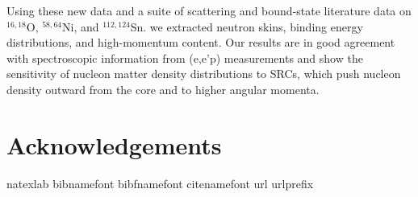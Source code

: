 \documentclass[twocolumn,secnumarabic,amssymb, nobibnotes, aps, prl,
superscriptaddress, nobalancelastpage]{revtex4}
\newcommand{\oSixEight}{\ensuremath{^{16,18}}O}
\newcommand{\niEightFour}{\ensuremath{^{58,64}}N\lowercase{i}}
\newcommand{\snTwelveFour}{\ensuremath{^{112,124}}S\lowercase{n}}
\begin{document}
Using these new data and a suite of scattering and bound-state literature data
on \oSixEight, \niEightFour, and \snTwelveFour.
we extracted neutron skins, binding energy distributions, and high-momentum
content. Our results are in good agreement with spectroscopic information
from (e,e'p) measurements and show the sensitivity of nucleon matter density
distributions to SRCs, which push nucleon density outward from the core and
to higher angular momenta.

\section{Acknowledgements}


\begin{thebibliography}{32} \expandafter\ifx\csname
        natexlab\endcsname\relax\def\natexlab#1{#1}\fi \expandafter\ifx\csname
        bibnamefont\endcsname\relax \def\bibnamefont#1{#1}\fi
        \expandafter\ifx\csname bibfnamefont\endcsname\relax
        \def\bibfnamefont#1{#1}\fi \expandafter\ifx\csname
        citenamefont\endcsname\relax \def\citenamefont#1{#1}\fi
        \expandafter\ifx\csname url\endcsname\relax \def\url#1{\texttt{#1}}\fi
        \expandafter\ifx\csname urlprefix\endcsname\relax\def\urlprefix{URL
        }\fi \providecommand{\bibinfo}[2]{#2}
        \providecommand{\eprint}[2][]{\url{#2}}

\end{thebibliography}
\end{document}
